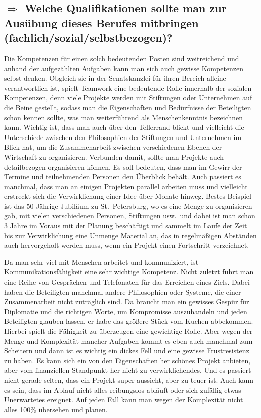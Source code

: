 \documentclass[12pt,headsepline,a4paper]{scrartcl}
\newcommand\quest[1]{\subsection*{$\Rightarrow$ #1}}
\begin{document}
\quest{Welche Qualifikationen sollte man zur Ausübung dieses Berufes mitbringen (fachlich/sozial/selbstbezogen)?}
Die Kompetenzen für einen solch bedeutenden Posten sind weitreichend und anhand der aufgezählten Aufgaben kann man sich auch gewisse Kompetenzen selbst denken.
Obgleich sie in der Senatskanzlei für ihren Bereich alleine verantwortlich ist, spielt Teamwork eine bedeutende Rolle innerhalb der sozialen Kompetenzen, denn viele Projekte werden mit Stiftungen oder Unternehmen auf die Beine gestellt, sodass man die Eigenschaften und Bedürfnisse der Beteiligten schon kennen sollte, was man weiterführend als Menschenkenntnis bezeichnen kann. Wichtig ist, dass man auch über den Tellerrand blickt und vielleicht die Unterschiede zwischen den Philosophien der Stiftungen und Unternehmen im Blick hat, um die Zusammenarbeit zwischen verschiedenen Ebenen der Wirtschaft zu organisieren.
Verbunden damit, sollte man Projekte auch detailbezogen organisieren können. Es soll bedeuten, dass man im Gewirr der Termine und teilnehmenden Personen den Überblick behält. Auch passiert es manchmal, dass man an einigen Projekten parallel arbeiten muss und vielleicht erstreckt sich die Verwirklichung einer Idee über Monate hinweg.
Bestes Beispiel ist das 50 Jährige Jubiläum zu St.\ Petersburg, wo es eine Menge zu organisieren gab, mit vielen verschiedenen Personen, Stiftungen usw.\ und dabei ist man schon 3 Jahre im Voraus mit der Planung beschäftigt und sammelt im Laufe der Zeit bis zur Verwirklichung eine Unmenge Material an, das in regelmäßigen Abständen auch hervorgeholt werden muss, wenn ein Projekt einen Fortschritt verzeichnet.

Da man sehr viel mit Menschen arbeitet und kommuniziert, ist Kommunikationsfähigkeit eine sehr wichtige Kompetenz. Nicht zuletzt führt man eine Reihe von Gesprächen und Telefonaten für das Erreichen eines Ziels. Dabei haben die Beteiligten manchmal andere Philosophien oder Systeme, die einer Zusammenarbeit nicht zuträglich sind. Da braucht man ein gewisses Gespür für Diplomatie und die richtigen Worte, um Kompromisse auszuhandeln und jeden Beteiligten glauben lassen, er habe das größere Stück vom Kuchen abbekommen. Hierbei spielt die Fähigkeit zu überzeugen eine gewichtige Rolle.
Aber wegen der Menge und Komplexität mancher Aufgaben kommt es eben auch manchmal zum  Scheitern und dann ist es wichtig ein dickes Fell und eine gewisse Frustresistenz zu haben. Es kann sich ein von den Eigenschaften her schönes Projekt anbieten, aber vom finanziellen Standpunkt her nicht zu verwirklichendes. Und es passiert nicht gerade selten, dass ein Projekt super aussieht, aber zu teuer ist. Auch kann es sein, dass im Ablauf nicht alles reibungslos abläuft oder sich zufällig etwas Unerwartetes ereignet. Auf jeden Fall kann man wegen der Komplexität nicht alles 100\% übersehen und planen.
\end{document}
